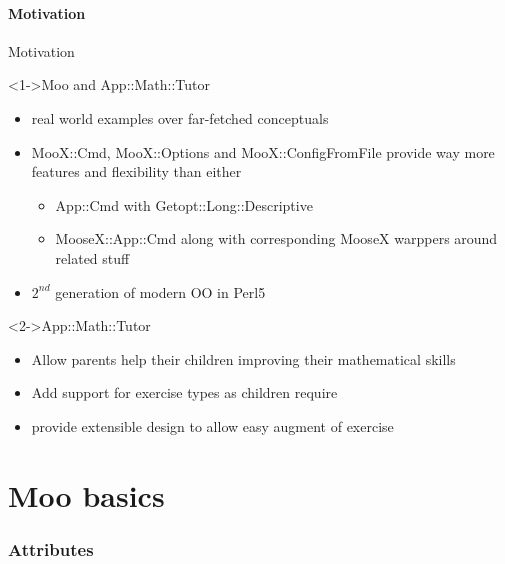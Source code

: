 \documentclass[ngerman,xcolor={table,dvipsnames},smaller,compress,hyperref={bookmarks,colorlinks}]{beamer}
\begin{document}
\subsection{Motivation}

\begin{frame}[t,fragile]{Motivation}

\begin{block}<1->{Moo and App::Math::Tutor}
\begin{itemize}
\item real world examples over far-fetched conceptuals
\item MooX::Cmd, MooX::Options and MooX::ConfigFromFile provide way more features and flexibility than either
      \begin{itemize}
      \item App::Cmd with Getopt::Long::Descriptive
      \item MooseX::App::Cmd along with corresponding MooseX warppers around related stuff
      \end{itemize}
\item $ 2^{nd} $ generation of modern OO in Perl5
\end{itemize}
\end{block}

\begin{block}<2->{App::Math::Tutor}
\begin{itemize}
\item Allow parents help their children improving their mathematical skills
\item Add support for exercise types as children require
\item provide extensible design to allow easy augment of exercise
\end{itemize}
\end{block}

\end{frame}

\part{Moo basics}

\section{Attributes}
\end{document}
